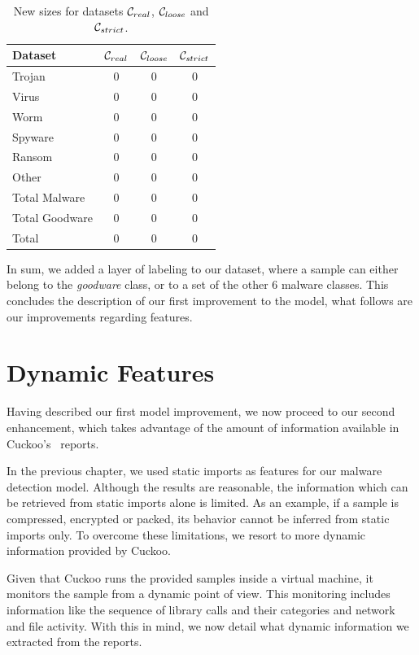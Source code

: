 \begin{table}[!htb]
	\renewcommand{\arraystretch}{1.2} %
	\centering
	\begin{tabular}{lccc}
		\toprule
		Dataset			& $\mathcal{C}_{real}$ & $\mathcal{C}_{loose}$ & $\mathcal{C}_{strict}$	\\
		\midrule
		Trojan			& 0 & 0 & 0\\
		Virus			& 0 & 0 & 0\\
		Worm			& 0 & 0 & 0\\
		Spyware			& 0 & 0 & 0\\
		Ransom			& 0 & 0 & 0\\
		Other			& 0 & 0 & 0\\
		\midrule
		Total Malware	& 0 & 0 & 0\\
		Total Goodware	& 0 & 0 & 0\\
		\midrule
		\midrule
		Total			& 0 & 0 & 0\\
		\bottomrule
	\end{tabular}
	\caption{New sizes for datasets $\mathcal{C}_{real}$, $\mathcal{C}_{loose}$ and $\mathcal{C}_{strict}$.}
	\label{tab:dataset_sizes_new}
\end{table}

In sum, we added a layer of labeling to our dataset, where a sample can either belong to the \textit{goodware} class, or to a set of the other 6 malware classes.
This concludes the description of our first improvement to the model, what follows are our improvements regarding features.

\section{Dynamic Features}
\label{section:improvements_dynamic_features}

Having described our first model improvement, we now proceed to our second enhancement, which takes advantage of the amount of information available in Cuckoo's~\cite{tool:cuckoo} reports.

In the previous chapter, we used static imports as features for our malware detection model.
Although the results are reasonable, the information which can be retrieved from static imports alone is limited.
As an example, if a sample is compressed, encrypted or packed, its behavior cannot be inferred from static imports only.
To overcome these limitations, we resort to more dynamic information provided by Cuckoo.

Given that Cuckoo runs the provided samples inside a virtual machine, it monitors the sample from a dynamic point of view.
This monitoring includes information like the sequence of library calls and their categories and network and file activity.
With this in mind, we now detail what dynamic information we extracted from the reports.

